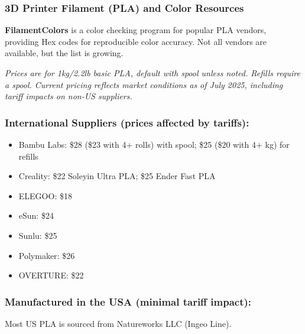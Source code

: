 \subsubsection{3D Printer Filament (PLA) and Color Resources}

\textbf{FilamentColors} is a color checking program for popular PLA vendors, providing Hex codes for reproducible color accuracy. Not all vendors are available, but the list is growing.

\textit{Prices are for 1kg/2.2lb basic PLA, default with spool unless noted. Refills require a spool. Current pricing reflects market conditions as of July 2025, including tariff impacts on non-US suppliers.}

\subsubsection{International Suppliers (prices affected by tariffs):}

\begin{itemize}
    \item Bambu Labs: \$28 (\$23 with 4+ rolls) with spool; \$25 (\$20 with 4+ kg) for refills
    \item Creality: \$22 Soleyin Ultra PLA; \$25 Ender Fast PLA
    \item ELEGOO: \$18
    \item eSun: \$24
    \item Sunlu: \$25
    \item Polymaker: \$26
    \item OVERTURE: \$22
\end{itemize}


\subsubsection{Manufactured in the USA (minimal tariff impact):}

Most US PLA is sourced from Natureworks LLC (Ingeo Line).

